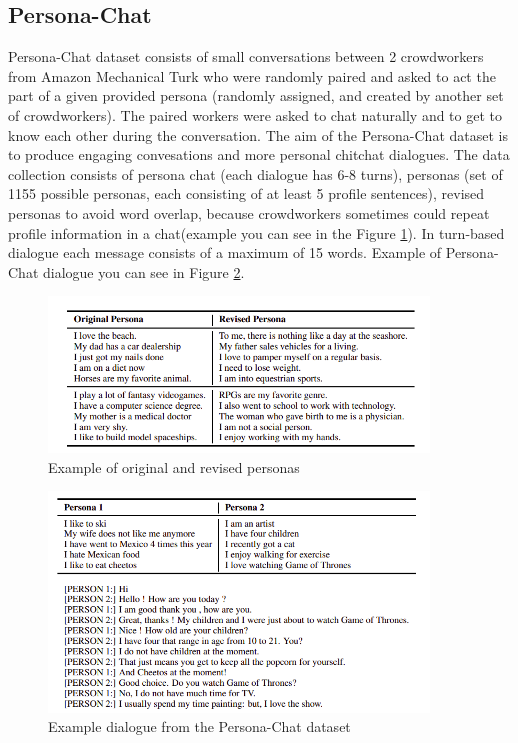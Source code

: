 \subsection{Persona-Chat}
Persona-Chat dataset consists of small conversations between 2 crowdworkers from Amazon Mechanical Turk who were randomly paired and asked to act the part of a given provided persona (randomly assigned, and created by another set of crowdworkers). The paired workers were asked to chat naturally and to get to know each other during the conversation. The aim of the Persona-Chat dataset is to produce engaging convesations and more personal chitchat dialogues.  The data collection consists of persona chat (each dialogue has 6-8 turns), personas (set of 1155 possible personas, each consisting of at least 5 profile sentences), revised personas to avoid word overlap, because crowdworkers sometimes could repeat profile information in a chat(example you can see in the Figure \ref{revised_persona}). In turn-based dialogue each message consists of a maximum of 15 words. Example of Persona-Chat dialogue you can see in Figure \ref{persona_chat}. 

\begin{figure}[hbt]
  \centering
  \includegraphics[width=0.9\textwidth]{figures/persona.png}
  \caption{Example of original and revised personas \cite{persona_chat}}
  \label{revised_persona}
\end{figure}

\begin{figure}[hbt]
  \centering
  \includegraphics[width=0.9\textwidth]{figures/persona_chat.png}
  \caption{Example dialogue from the Persona-Chat dataset \cite{persona_chat}}
  \label{persona_chat}
\end{figure}


